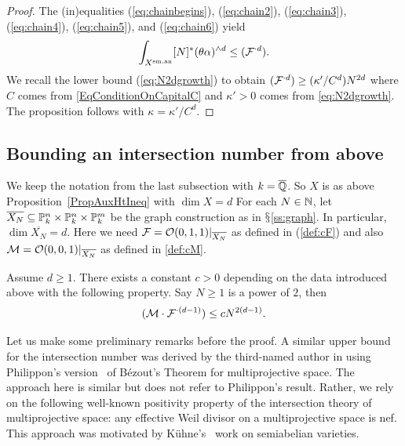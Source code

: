\begin{proof}
The (in)equalities  (\ref{eq:chainbegins}),
(\ref{eq:chain2}), (\ref{eq:chain3}),
(\ref{eq:chain4}), (\ref{eq:chain5}), and (\ref{eq:chain6}) yield
\begin{equation*}
  \int_{{X}^{\mathrm{sm,an}}} [N]^*(\theta\alpha)^{\wedge d} \le ({\mathcal F}^{\cdot d}). 
\end{equation*}
We recall the  lower bound (\ref{eq:N2dgrowth}) %
to  obtain
$({\mathcal F}^{\cdot d}) \ge (\kappa'/C^d) N^{2d}$ where $C$ comes from
\eqref{EqConditionOnCapitalC} and $\kappa' > 0$ comes from
\eqref{eq:N2dgrowth}.
The proposition follows with $\kappa = \kappa'/C^d$. 
\end{proof}


\subsection{Bounding an intersection number from above}

We keep the notation from the last subsection with $k={\overline{\mathbb{Q}}}$. 
So  $X$ is as above Proposition~\ref{PropAuxHtIneq} with $\dim X=d$
For each $N \in {\mathbb{N}}$, let $\overline{X_N} \subseteq {\mathbb{P}}_k^n \times
{\mathbb{P}}_k^n \times {\mathbb{P}}_k^m$ be the graph construction as in $\mathsection$\ref{ss:graph}. In
particular, $\dim \overline{X_N} = d$.  Here we need ${\mathcal F} =
{\mathcal O}(0,1,1)|_{\overline{X_N}}$ as defined in (\ref{def:cF}) and also
 ${\mathcal M} = {\mathcal O}(0,0,1)|_{\overline{X_N}}$ as defined in \eqref{def:cM}.

\begin{proposition}
  \label{prop:intersectionub}
Assume $d \ge 1$.  There exists a constant $c>0$ depending on the data introduced above
  with the following property. Say $N\ge 1$ is a power of $2$, then
  \begin{equation*}
    ({\mathcal M}\cdot {\mathcal F}^{\cdot(d-1)}) \le c N^{2(d-1)}.
  \end{equation*}
\end{proposition}

Let us make some preliminary remarks before the proof. A similar upper
bound for the intersection number was derived by the third-named
author in \cite{habegger:imrn,Hab:Special} using Philippon's
version~\cite{Philippon} of B\'ezout's Theorem for multiprojective
space. The approach here is similar but does not
 refer to Philippon's result. Rather, we rely on the following well-known
positivity property of the intersection theory of multiprojective
space: any effective Weil divisor on a multiprojective space is
nef. This approach was motivated by
K\"uhne's~\cite{kuehne:semiabelianbhc} work on semiabelian varieties.

